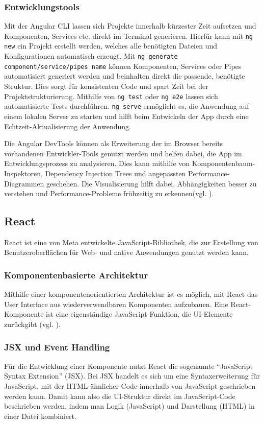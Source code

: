 \documentclass[oneside]{ausarbeitung}
\begin{document}
\subsubsection{Entwicklungstools}
Mit der Angular CLI lassen sich Projekte innerhalb kürzester Zeit aufsetzen und Komponenten, Services etc. direkt im Terminal generieren. Hierfür kann mit \texttt{ng new} ein Projekt erstellt werden, welches alle benötigten Dateien und Konfigurationen automatisch erzeugt. Mit \texttt{ng generate component/service/pipes name} können Komponenten, Services oder Pipes automatisiert generiert werden und beinhalten direkt die passende, benötigte Struktur. Dies sorgt für konsistenten Code und spart Zeit bei der Projektstrukturierung. Mithilfe von \texttt{ng test} oder \texttt{ng e2e} lassen sich automatisierte Tests durchführen. \texttt{ng serve} ermöglicht es, die Anwendung auf einem lokalen Server zu starten und hilft beim Entwickeln der App durch eine Echtzeit-Aktualisierung der Anwendung. 

Die Angular DevTools können als Erweiterung der im Browser bereits vorhandenen Entwickler-Tools genutzt werden und helfen dabei, die App im Entwicklungsprozess  zu analysieren. Dies kann mithilfe von Komponentenbaum-Inspektoren, Dependency Injection Trees und angepassten Performance-Diagrammen geschehen. Die Visualisierung hilft dabei, Abhängigkeiten besser zu verstehen und Performance-Probleme frühzeitig zu erkennen(vgl. \parencite{angular}).


\subsection{React}
React ist eine von Meta entwickelte JavaScript-Bibliothek, die zur Erstellung von Benutzeroberflächen für Web- und native Anwendungen genutzt werden kann.

\subsubsection{Komponentenbasierte Architektur}
Mithilfe einer komponentenorientierten Architektur ist es möglich, mit React das User Interface aus wiederverwendbaren Komponenten aufzubauen. Eine React-Komponente ist eine eigenständige JavaScript-Funktion, die UI-Elemente zurückgibt (vgl. \parencite{react}).

\subsubsection{JSX und Event Handling}
Für die Entwicklung einer Komponente nutzt React die sogenannte “JavaScript Syntax Extension” (JSX). Bei JSX handelt es sich um eine Syntaxerweiterung für JavaScript, mit der HTML-ähnlicher Code innerhalb von JavaScript geschrieben werden kann. Damit kann also die UI-Struktur direkt im JavaScript-Code beschrieben werden, indem man Logik (JavaScript) und Darstellung (HTML) in einer Datei kombiniert. 
\end{document}
